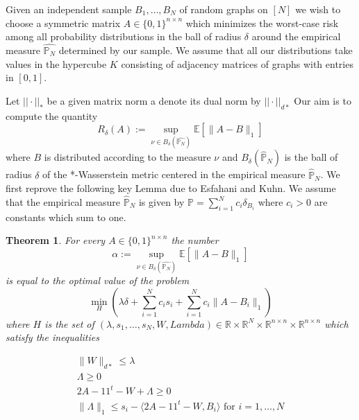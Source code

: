 \documentclass[12pt]{amsart}
\newtheorem{theorem}[lemma]{Theorem}
\numberwithin{equation}{section}
\newcommand{\PP}{\mathbb{P}}
\newcommand{\RR}{\mathbb{R}}
\newcommand{\EE}{\mathbb{E}}
\begin{document}
Given an independent sample $B_1,\dots, B_N$ of random graphs on $[N]$ we wish to choose a symmetric matrix $A\in \{0,1\}^{n\times n}$ which minimizes the worst-case risk among all probability distributions in the ball of radius $\delta$ around the empirical measure $\hat{\mathbb{P}_N}$ determined by our sample. We assume that all our distributions take values in the hypercube $K$ consisting of adjacency matrices of graphs with entries in $[0,1]$. 

Let $||\cdot||_{*}$ be a given matrix norm a denote its dual norm by $||\cdot||_{d*}$ Our aim is to compute the quantity
\[R_{\delta}(A):=\sup_{\nu\in B_{\delta}(\hat{\mathbb{P}_N})}\EE[\|A-B\|_1]\]
where $B$ is distributed according to the measure $\nu$ and $B_\delta(\hat{\mathbb{P}}_N)$ is the ball of radius $\delta$ of the *-Wasserstein metric centered in the empirical measure $\hat{\mathbb{P}}_N$. We first reprove the following key Lemma due to Esfahani and Kuhn. We assume that the empirical measure $\hat{\mathbb{P}}_N$ is given by $\PP=\sum_{i=1}^Nc_i\delta_{B_i}$ where $c_i>0$ are constants which sum to one. 

\begin{theorem}
\label{teoError}
For every $A\in \{0,1\}^{n\times n}$ the number \[\alpha:=\sup_{\nu\in B_{\delta}(\hat{\mathbb{P}_N})} \EE[\|A-B\|_1]\]
is equal to the optimal value of the problem
\[\min_{H} \left(\lambda\delta +\sum_{i=1}^N c_is_i+\sum_{i=1}^Nc_i\|A-B_i\|_1\right)\]
where $H$ is the set of $(\lambda, s_1,\dots, s_N, W,Lambda)\in \RR\times\RR^N\times \RR^{n\times n} \times \RR^{n\times n}$ which satisfy the inequalities
\begin{center}
\[
\begin{array}{l}
\|W\|_{d*}\leq \lambda\\
\Lambda \geq 0\\
2A-11^t-W + \Lambda \geq 0\\
\|\Lambda\|_{1}\leq s_i-\langle 2A-11^t-W, B_i\rangle\text{ for $i=1,\dots, N$}
\end{array}
\]
\end{center}

\end{theorem}
\end{document}
